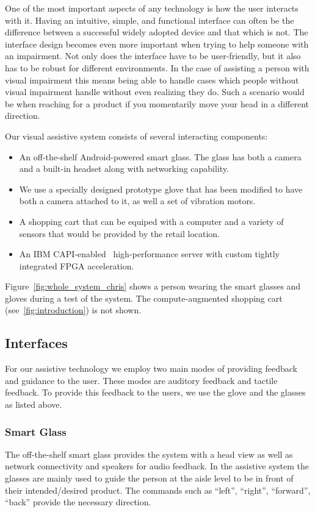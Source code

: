 One of the most important aspects of any technology is how the user interacts with it.
Having an intuitive, simple, and functional interface can often be the difference between
a successful widely adopted device and that which is not. The interface design becomes even more important
when trying to help someone with an impairment. Not only does the interface have to be user-friendly, 
but it also has to be robust for different environments. 
In the case of assisting a person with visual impairment this means being able to handle cases
which people without visual impairment handle without even realizing they do. 
Such a scenario would be when reaching for a product if you momentarily move your head in a different direction.

Our visual assistive system consists of several interacting components: 

\begin{itemize}
\item An off-the-shelf Android-powered smart glass. 
The glass has both a camera and a built-in headset along with networking capability. 
\item We use a specially designed prototype glove that has been
modified to have both a camera attached to it, as well a set of
vibration motors. 
\item A shopping cart that can be equiped with a computer
and a variety of sensors that would be provided by the retail location.
\item An IBM CAPI-enabled~\cite{CAPI} high-performance server with custom tightly integrated FPGA 
acceleration.
\end{itemize}

Figure~\ref{fig:whole_system_chris} shows a person wearing the smart
glasses and gloves during a test of the system. The compute-augmented
shopping cart (see~\ref{fig:introduction}) is not shown.

\subsection{Interfaces}
For our assistive technology we employ two main modes of providing feedback and guidance to the user. These modes are auditory feedback and tactile feedback. 
To provide this feedback to the users, we use the glove and the glasses as listed above.
\subsubsection{Smart Glass}
The off-the-shelf smart glass provides the system with a head view as well as 
network connectivity and speakers for audio feedback.
In the assistive system the glasses are mainly used to guide the person at the aisle level
to be in front of their intended/desired product. The commands such as ``left'', ``right'', ``forward'', ``back''
provide the necessary direction. 
